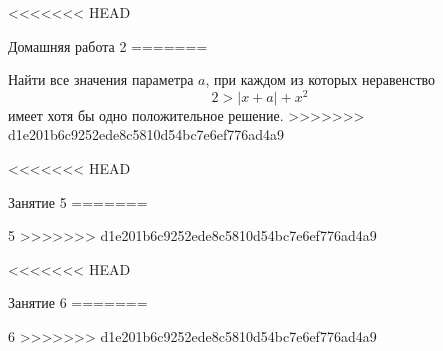 \begin{homework}[number=2]
	\begin{listofex}
<<<<<<< HEAD
		\item Домашняя работа 2
=======
		\item Найти все значения параметра \( a \), при каждом из которых неравенство
		\[ 2 > |x+a|+x^2 \]
		имеет хотя бы одно положительное решение.
>>>>>>> d1e201b6c9252ede8c5810d54bc7e6ef776ad4a9
	\end{listofex}
\end{homework}

\begin{class}[number=5]
	\begin{listofex}
<<<<<<< HEAD
		\item Занятие 5
=======
		\item 5
>>>>>>> d1e201b6c9252ede8c5810d54bc7e6ef776ad4a9
	\end{listofex}
\end{class}

\begin{class}[number=6]
	\begin{listofex}
<<<<<<< HEAD
		\item Занятие 6
=======
		\item 6
>>>>>>> d1e201b6c9252ede8c5810d54bc7e6ef776ad4a9
	\end{listofex}
\end{class}

